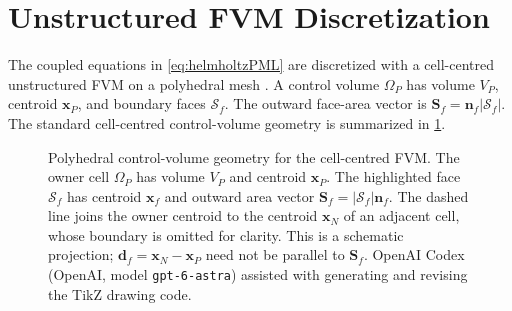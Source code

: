 \documentclass[final,12pt,nopreprintline,longtitle]{elsarticle}
\newcommand{\paperroot}{}
\newcommand{\paperroot}{paper_aHF/}
\newcommand{\paperinput}[1]{}
\newcommand{\x}{\mathbf{x}}
\newcommand{\Sf}{\mathbf{S}_f}
\begin{document}
\section{Unstructured FVM Discretization}
\label{sec:discretization}

The coupled equations in \cref{eq:helmholtzPML} are discretized with a
cell-centred unstructured FVM on a polyhedral mesh
\cite{Jasak1996,Moukalled2016}.  A control volume $\Omega_P$ has volume $V_P$,
centroid $\x_P$, and boundary faces $\mathcal{S}_f$.  The outward face-area
vector is $\Sf=\mathbf{n}_f|\mathcal{S}_f|$.  The standard cell-centred
control-volume geometry is summarized in
\cref{fig:standardFVMControlVolume}.

\begin{figure}[htbp]
    \centering
    \paperinput{revised-assets/figures/fvm_control_volume_tikz.tex}
    \caption{Polyhedral control-volume geometry for the cell-centred FVM.
    The owner cell $\Omega_P$ has volume $V_P$ and centroid $\x_P$.
    The highlighted face $\mathcal S_f$ has centroid $\x_f$ and outward
    area vector $\Sf=|\mathcal S_f|\mathbf n_f$.  The dashed line joins
    the owner centroid to the centroid $\x_N$ of an adjacent cell, whose
    boundary is omitted for clarity.  This is a schematic projection;
    $\mathbf d_f=\x_N-\x_P$ need not be parallel to $\Sf$.
    OpenAI Codex (OpenAI, model \texttt{gpt-6-astra}) assisted with generating
    and revising the TikZ drawing code.}
    \label{fig:standardFVMControlVolume}
\end{figure}
\end{document}
